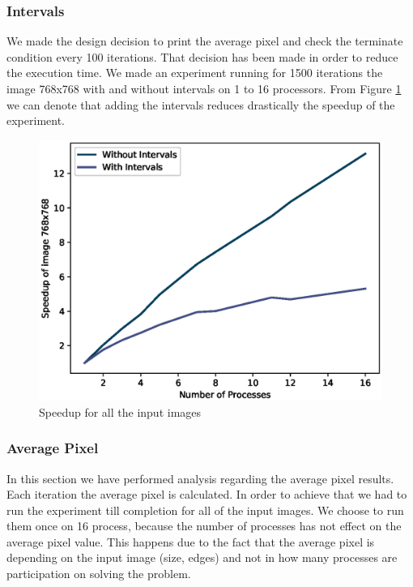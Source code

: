 \documentclass[12pt,a4paper]{article}
\begin{document}
        \subsubsection{Intervals}
          We made the design decision to print the average pixel and check the terminate condition every 100 iterations. That decision has been made in order to reduce the execution time. We made an experiment running for 1500 iterations the image 768x768 with and without intervals on 1 to 16 processors. From Figure \ref{speedupWithInterval} we can denote that adding the intervals reduces drastically the speedup of the experiment. 

          \begin{figure}[ht]
              \centering
              \includegraphics[scale=0.6]{../graphs/speedupInterval.eps}
              \caption{Speedup for all the input images}
              \label{speedupWithInterval}
          \end{figure}

        \subsubsection{Average Pixel}

        	In this section we have performed analysis regarding the average pixel results. Each iteration the average pixel is calculated. In order to achieve that we had to run the experiment till completion for all of the input images. We choose to run them once on 16 process, because the number of processes has not effect on the average pixel value. This happens due to the fact that the average pixel is depending on the input image (size, edges) and not in how many processes are participation on solving the problem.
\end{document}
